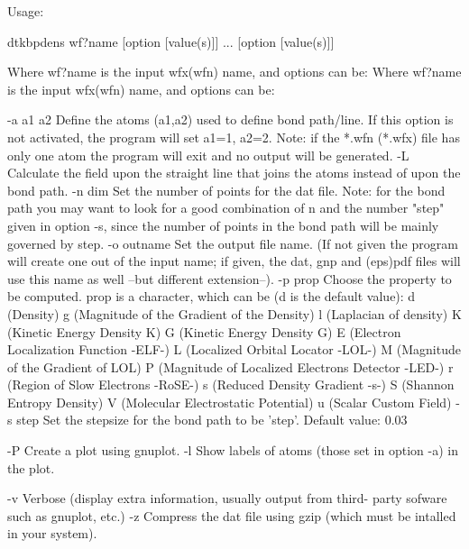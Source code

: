 

Usage:

	dtkbpdens wf?name [option [value(s)]] ... [option [value(s)]]

Where wf?name is the input wfx(wfn) name, and options can be:
Where wf?name is the input wfx(wfn) name, and options can be:

  -a a1 a2  	Define the atoms  (a1,a2) used to define bond path/line.
            	  If this option is not activated, the program will 
            	  set a1=1, a2=2.
            	  Note: if the *.wfn (*.wfx) file has only one atom
            	  the program will exit and no output will be generated.
  -L        	Calculate the field upon the straight line that joins the atoms
            	  instead of upon the bond path.
  -n  dim   	Set the number of points for the dat file.
            	  Note: for the bond path you may want to look for a good 
            	  combination of n and the number "step" given in option -s,
            	  since the number of points in the bond path will be mainly 
            	  governed by step.
  -o outname	Set the output file name.
            	  (If not given the program will create one out of
            	  the input name; if given, the dat, gnp and (eps)pdf files will
            	  use this name as well --but different extension--).
  -p prop   	Choose the property to be computed. prop is a character,
            	  which can be (d is the default value): 
            		d (Density)
            		g (Magnitude of the Gradient of the Density)
            		l (Laplacian of density)
            		K (Kinetic Energy Density K)
            		G (Kinetic Energy Density G)
            		E (Electron Localization Function -ELF-)
            		L (Localized Orbital Locator -LOL-)
            		M (Magnitude of the Gradient of LOL)
            		P (Magnitude of Localized Electrons Detector -LED-)
            		r (Region of Slow Electrons -RoSE-)
            		s (Reduced Density Gradient -s-)
            		S (Shannon Entropy Density)
            		V (Molecular Electrostatic Potential)
            		u (Scalar Custom Field)
  -s step   	Set the stepsize for the bond path to be 'step'.
            	  Default value: 0.03

  -P     	Create a plot using gnuplot.
  -l     	Show labels of atoms (those set in option -a) in the plot.

  -v     	Verbose (display extra information, usually output from third-
         	  party sofware such as gnuplot, etc.)
  -z     	Compress the dat file using gzip (which must be intalled
         	   in your system).

